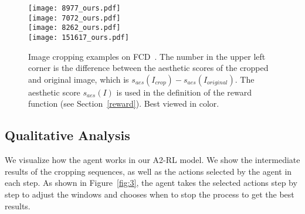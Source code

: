 \documentclass[10pt,twocolumn,letterpaper]{article}
\begin{document}
\begin{figure*}[ht]
\begin{center}
{%
\centering
\begin{minipage}[b]{0.14\textwidth}
\texttt{[image: 8977\_ours.pdf]} \\
\texttt{[image: 7072\_ours.pdf]} \\
\texttt{[image: 8262\_ours.pdf]}\\
\texttt{[image: 151617\_ours.pdf]}
\end{minipage}
}
\subfigure[Ground Truth]{
\centering
\begin{minipage}[b]{0.14\textwidth}
\texttt{[image: 8977\_gt.pdf]} \\
\texttt{[image: 7072\_gt.pdf]} \\
\texttt{[image: 8262\_gt.pdf]} \\
\texttt{[image: 151617\_gt.pdf]}
\end{minipage}
}
\end{center}
\caption{Image cropping examples on FCD~\cite{chen2017quantitative}. The number in the upper left corner is the difference between the aesthetic scores of the cropped and original image, which is $s_{aes}(I_{crop})-s_{aes}(I_{original})$. The aesthetic score $s_{aes}(I)$ is used in the definition of the reward function (see Section~\ref{reward}). Best viewed in color.}
\label{fig:4}
\end{figure*}

\subsection{Qualitative Analysis}
We visualize how the agent works in our A2-RL model. We show the intermediate results of the cropping sequences, as well as the actions selected by the agent in each step. As shown in Figure~\ref{fig:3}, the agent takes the selected actions step by step to adjust the windows and chooses when to stop the process to get the best results.
\end{document}
